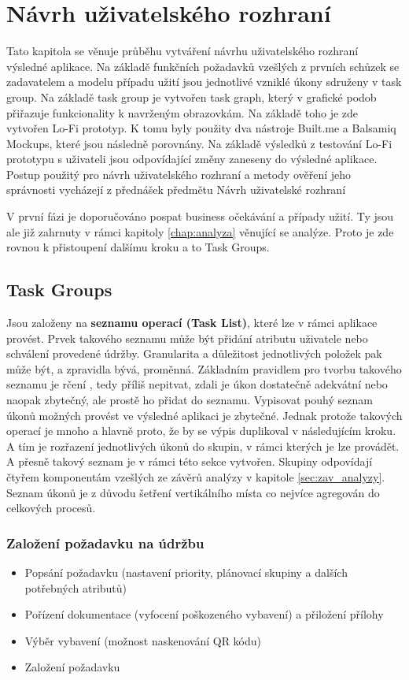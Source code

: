 \documentclass[thesis=M,czech]{FITthesis}[2012/06/26]
\begin{document}
\chapter{Návrh uživatelského rozhraní}
Tato kapitola se věnuje průběhu vytváření návrhu uživatelského rozhraní výsledné aplikace. Na základě funkčních požadavků vzešlých z prvních schůzek se zadavatelem a modelu případu užití jsou jednotlivé vzniklé úkony sdruženy v task group. Na základě task group je vytvořen task graph, který v grafické podob přiřazuje funkcionality k navrženým obrazovkám. Na základě toho je zde vytvořen Lo-Fi prototyp. K tomu byly použity dva nástroje Built.me a Balsamiq Mockups, které jsou následně porovnány. Na základě výsledků z testování Lo-Fi prototypu s uživateli jsou odpovídající změny zaneseny do výsledné aplikace. Postup použitý pro návrh uživatelského rozhraní a metody ověření jeho správnosti vycházejí z přednášek předmětu Návrh uživatelské rozhraní \cite{nur}

V první fázi je doporučováno pospat business očekávání a případy užití. Ty jsou ale již zahrnuty v rámci kapitoly \ref{chap:analyza} věnující se analýze. Proto je zde rovnou k přistoupení dalšímu kroku a to Task Groups.

\section{Task Groups}
\label{sec:task_groups}
Jsou založeny na \textbf{seznamu operací (Task List)}, které lze v rámci aplikace provést. Prvek takového seznamu může být přidání atributu uživatele nebo schválení provedené údržby. Granularita a důležitost jednotlivých položek pak může být, a zpravidla bývá, proměnná. Základním pravidlem pro tvorbu takového seznamu je rčení , tedy příliš nepitvat, zdali je úkon dostatečně adekvátní nebo naopak zbytečný, ale prostě ho přidat do seznamu. Vypisovat pouhý seznam úkonů možných provést ve výsledné aplikaci je zbytečné. Jednak protože takových operací je mnoho a hlavně proto, že by se výpis duplikoval v následujícím kroku. A tím je rozřazení jednotlivých úkonů do skupin, v rámci kterých je lze provádět. A přesně takový seznam je v rámci této sekce vytvořen. Skupiny odpovídají čtyřem komponentám vzešlých ze závěrů analýzy v kapitole \ref{sec:zav_analyzy}. Seznam úkonů je z důvodu šetření vertikálního místa co nejvíce agregován do celkových procesů.

\subsection{Založení požadavku na údržbu}
\begin{itemize}
	\item
	Popsání požadavku (nastavení priority, plánovací skupiny a dalších potřebných atributů)
	\item
	Pořízení dokumentace (vyfocení poškozeného vybavení) a přiložení přílohy
	\item
	Výběr vybavení (možnost naskenování QR kódu)
	\item
	Založení požadavku
\end{itemize} 
\end{document}
